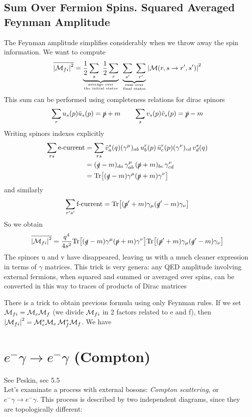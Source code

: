 \documentclass[TheoreticalPhy_ModB.tex]{subfiles}
\begin{document}
\subsection{Sum Over Fermion Spins. Squared Averaged Feynman Amplitude}
The Feynman amplitude simplifies considerably when we throw away the spin information. We want to compute
\[
\overline{\abs{\mathM_{fi}}^2} = \underbrace{\frac{1}{2} \sum_s \ \frac{1}{2} \sum_r}_{\textup{average over} \atop \text{the initial states}} \ 
	\underbrace{\sum_{s'} \ \sum_{r'}}_{\textup{sum over} \atop \text{final states}} \abs{\mathM(r,s \to r',s')}^2
\]
This sum can be performed using completeness relations for dirac spinors
\[
\sum_r u_s(p) \bar{u}_s(p) = \slashed p + m
\qquad
\sum_s v_s(p) \bar{v}_s(p) = \slashed p - m
\]
Writing spinors indexes explicitly 
\[
\begin{split}
\sum_{rs} \text{e-current}	& = \sum_{rs} \bar{v}^s_a(q) (\gamma^{\mu})_{ab} \, u^r_b(p) \, \bar{u}^r_c(p) (\gamma^{\nu})_{cd} \, v_d^s(q) \\
					& = (\slashed q - m)_{da} \, \gamma^{\mu}_{ab} \, (\slashed p + m)_{bc} \, \gamma_{cd}^{\nu} \\
					& = \textup{Tr} \bigl[ (\slashed q - m) \gamma^{\mu} (\slashed p + m) \gamma^{\nu} \bigr]
\end{split}
\]
and similarly
\[
\sum_{r's'} \text{f-current} = \textup{Tr} \bigl[ (\slashed p' + m) \gamma_{\mu} (\slashed q' - m)\gamma_{\nu} \bigr]
\]
So we obtain
\[
\overline{\left\lvert \mathcal{M}_{fi} \right\rvert^2} = \frac{q^4}{4s^2} \textup{Tr} \bigl[ (\slashed q - m) \gamma^{\mu} (\slashed p + m) \gamma^{\nu} \bigr]
	\textup{Tr} \bigl[ (\slashed p' + m) \gamma_{\mu} (\slashed q' -m) \gamma_{\nu} \bigr]
\]
The spinors u and v have disappeared, leaving us with a much cleaner expression in terms of $\gamma$ matrices. This trick is very genera: any QED amplitude involving external fermions, when squared and summed or averaged over spins, can be converted in this way to traces of products of Dirac matrices

\skipline
There is a trick to obtain previous formula using only Feynman rules. If we set $\mathcal{M}_{fi}=\mathcal{M}_e\mathcal{M}_f$ (we divide $\mathcal{M}_{fi}$ in 2 factors related to e and f), then $\left\lvert \mathcal{M}_{fi} \right\rvert^2 = \mathcal{M}_e^* \mathcal{M}_e \, \mathcal{M}_f^* \mathcal{M}_f$. We have
\todo{Feynman diagram}

\section{$e^-\gamma\rightarrow e^-\gamma$ (Compton)}
\textsf{See Peskin, sec 5.5}\\
Let's examinate a process with external bosons: \emph{Compton scattering}, or $e^-\gamma\rightarrow e^-\gamma$. This process is described by two independent diagrams, since they are topologically different:
\end{document}
